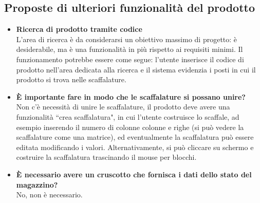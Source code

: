\subsection{Proposte di ulteriori funzionalità del prodotto}
\begin{itemize}
        \item \textbf{Ricerca di prodotto tramite codice}\\
        L'area di ricerca è da considerarsi un obiettivo massimo di progetto: è desiderabile, ma è una funzionalità in più rispetto ai requisiti minimi. Il funzionamento potrebbe essere come segue: l'utente inserisce il codice di prodotto nell'area dedicata alla ricerca e il sistema evidenzia i posti in cui il prodotto si trova nelle scaffalature.
        \item \textbf{È importante fare in modo che le scaffalature si possano unire?}\\
        Non c'è necessità di unire le scaffalature, il prodotto deve avere una funzionalità ``crea scaffalatura", in cui l'utente costruisce lo scaffale, ad esempio inserendo il numero di colonne colonne e righe (si può vedere la scaffalature come una matrice), ed eventualmente la scaffalatura può essere editata modificando i valori. Alternativamente, si può cliccare su schermo e costruire la scaffalatura trascinando il mouse per blocchi.
        \item \textbf{È necessario avere un cruscotto che fornisca i dati dello stato del magazzino?}\\
        No, non è necessario.
    \end{itemize}